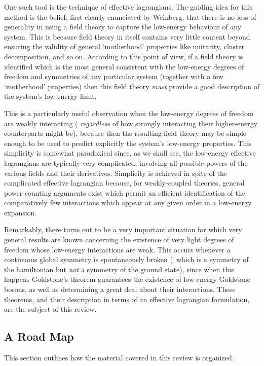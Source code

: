 \documentclass[12pt]{report}
\begin{document}
One such tool is the technique of effective lagrangians.
The guiding idea for this method is the belief, first
clearly enunciated by Weinberg, that there is no loss of
generality in using a field theory to capture the
low-energy behaviour of any system. This is because field
theory in itself contains very little content beyond
ensuring the validity of general `motherhood' properties
like unitarity, cluster decomposition, and so on. 
According to this point of view, if a field theory is
identified which is the most general consistent with the
low-energy degrees of freedom and symmetries of any
particular system (together with a few `motherhood'
properties) then this field theory {\it must} provide a
good description of the system's low-energy limit.

This is a particularly useful observation when the
low-energy degrees of freedom are weakly interacting ({\it
regardless} of how strongly interacting their higher-energy
counterparts might be), because then the resulting field
theory may be simple enough to be used to predict
explicitly the system's low-energy properties. This
simplicity is somewhat paradoxical since, as we shall see,
the low-energy effective lagrangians are typically very
complicated, involving all possible powers of the various
fields and their derivatives. Simplicity is achieved in
spite of the complicated effective lagrangian because, for
weakly-coupled theories, general power-counting arguments
exist which permit an efficient identification of the
comparatively few interactions which appear at any given
order in a low-energy expansion.

Remarkably, there turns out to be a very important
situation for which very general results are known
concerning the existence of very light degrees of freedom
whose low-energy interactions are weak. This occurs
whenever a continuous global symmetry is spontaneously
broken (\ie\ which is a symmetry of the hamiltonian but
{\em not} a symmetry of the ground state), since when this
happens Goldstone's theorem guarantees the existence of
low-energy Goldstone bosons, as well as determining a great
deal about their interactions. These theorems, and their
description in terms of an effective lagrangian
formulation, are the subject of this review.

\subsection{A Road Map}

This section outlines how the material covered in this
review is organized.
\end{document}
